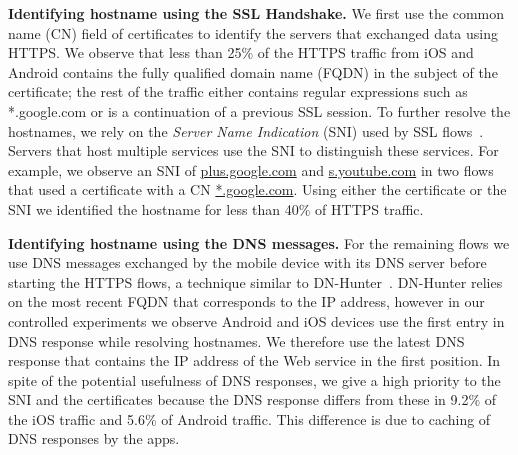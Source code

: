 
\noindent\textbf{Identifying hostname using the SSL Handshake.}
We first use the common name (CN) field of certificates to identify the servers that exchanged data using HTTPS.
We observe that less than 25\% of the HTTPS traffic from iOS and Android contains the fully qualified domain name (FQDN) in the subject of the certificate; the rest of the traffic either contains regular expressions such as *.google.com or is a continuation of a previous SSL session. 
To further resolve the hostnames, we rely on the \emph{Server Name Indication} (SNI) used by SSL flows~\cite{rfc:servernametls}.
Servers that host multiple services use the SNI to distinguish these services.   
For example, we observe an SNI of \url{plus.google.com} and \url{s.youtube.com} in two flows that used a certificate with a CN \url{*.google.com}.
Using either the certificate or the SNI we identified the hostname for	 less than 40\% of HTTPS traffic.

\noindent\textbf{Identifying hostname using the DNS messages.} 
For the remaining flows we use DNS messages exchanged by the mobile device with its DNS server before starting the HTTPS flows, a technique similar to DN-Hunter~\cite{bermudez:dnhunter}.
DN-Hunter relies on the most recent FQDN that corresponds to the IP address, however in our controlled experiments we observe Android and iOS devices use the first entry in DNS response while resolving hostnames.
We therefore use the latest DNS response that contains the IP address of the Web service in the first position.
In spite of the potential usefulness of DNS responses, we give a high priority to the SNI and the certificates because the DNS response differs from these in 9.2\% of the iOS traffic and 5.6\% of Android traffic.
This difference is due to caching of DNS responses by the apps.

